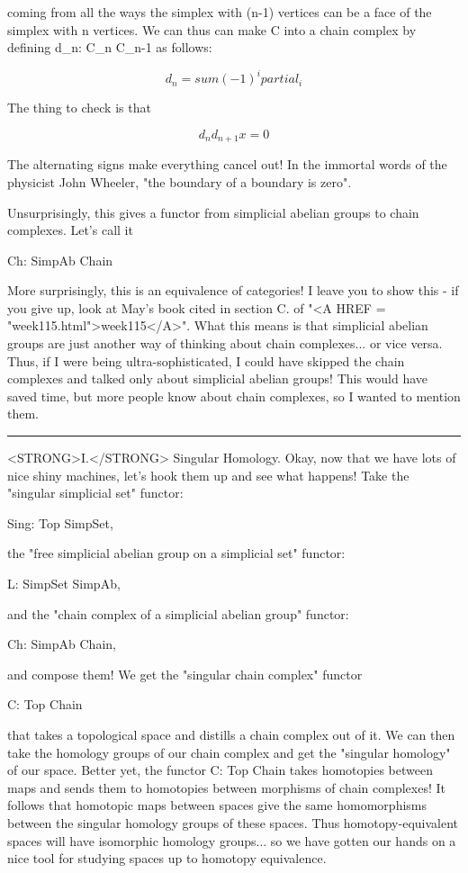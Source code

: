 coming from all the ways the simplex with (n-1) vertices can be a face
of the simplex with n vertices.  We can thus can make C into a chain
complex by defining d_{n}: C_{n} \to  C_{n-1} as follows:
                        

$$

                d_{n} = sum (-1)^{i} partial_{i} 
$$
    
The thing to check is that 

$$

                     d_{n} d_{n+1} x = 0 
$$
    
The alternating signs make everything cancel out!  In the immortal words
of the physicist John Wheeler, "the boundary of a boundary is zero".  

Unsurprisingly, this gives a functor from simplicial abelian groups
to chain complexes.  Let's call it

                Ch: SimpAb \to  Chain

More surprisingly, this is an equivalence of categories!  I leave you to
show this - if you give up, look at May's book cited in section C. of
"<A HREF = "week115.html">week115</A>".  What this means is that simplicial abelian groups are just
another way of thinking about chain complexes...  or vice versa.  Thus,
if I were being ultra-sophisticated, I could have skipped the chain
complexes and talked only about simplicial abelian groups!  This would
have saved time, but more people know about chain complexes, so I wanted
to mention them.

\par\noindent\rule{\textwidth}{0.4pt}
<STRONG>I.</STRONG>  Singular Homology.  Okay, now that we have lots of nice shiny
machines, let's hook them up and see what happens!  Take the "singular
simplicial set" functor:

                   Sing: Top \to  SimpSet, 

the "free simplicial abelian group on a simplicial set" functor:

                   L: SimpSet \to  SimpAb,

and the "chain complex of a simplicial abelian group" functor:

                   Ch: SimpAb \to  Chain,

and compose them!  We get the "singular chain complex" functor

                   C: Top \to  Chain

that takes a topological space and distills a chain complex out of it.
We can then take the homology groups of our chain complex and get the
"singular homology" of our space.  Better yet, the functor C: Top \to 
Chain takes homotopies between maps and sends them to homotopies between
morphisms of chain complexes!  It follows that homotopic maps between
spaces give the same homomorphisms between the singular homology groups
of these spaces.  Thus homotopy-equivalent spaces will have isomorphic
homology groups... so we have gotten our hands on a nice tool for
studying spaces up to homotopy equivalence.

